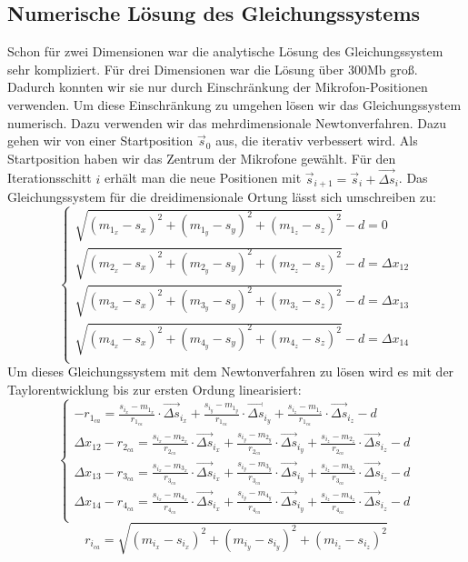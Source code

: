 \subsection{Numerische Lösung des Gleichungssystems}
Schon für zwei Dimensionen war die analytische Lösung des Gleichungssystem sehr kompliziert. Für drei Dimensionen war die Lösung über 300Mb groß. Dadurch konnten wir sie nur durch Einschränkung der Mikrofon-Positionen verwenden. Um diese Einschränkung zu umgehen lösen wir das Gleichungssystem numerisch. Dazu verwenden wir das mehrdimensionale Newtonverfahren. Dazu gehen wir von einer Startposition $\vec{s}_0$ aus, die iterativ verbessert wird. Als Startposition haben wir das Zentrum der Mikrofone gewählt. Für den Iterationsschitt $i$ erhält man die neue Positionen mit $\vec{s}_{i + 1} = \vec{s}_i + \vec{\Delta{s}}_i$. Das Gleichungssystem für die dreidimensionale Ortung lässt sich umschreiben zu:
$$\begin{cases}
\sqrt{(m_{1_x} - s_x)^2 + (m_{1_y} - s_y)^2 + (m_{1_z} - s_z)^2} - d = 0 \\
\sqrt{(m_{2_x} - s_x)^2 + (m_{2_y} - s_y)^2 + (m_{2_z} - s_z)^2} - d = \Delta{x_{12}} \\
\sqrt{(m_{3_x} - s_x)^2 + (m_{3_y} - s_y)^2 + (m_{3_z} - s_z)^2} - d = \Delta{x_{13}} \\
\sqrt{(m_{4_x} - s_x)^2 + (m_{4_y} - s_y)^2 + (m_{4_z} - s_z)^2} - d = \Delta{x_{14}} \\
\end{cases}$$
Um dieses Gleichungssystem mit dem Newtonverfahren zu lösen wird es mit der Taylorentwicklung bis zur ersten Ordung linearisiert:
$$\begin{cases}
-r_{1_{ca}} = \frac{s_{i_x} - m_{1_x}}{r_{1_{ca}}} \cdot \vec{\Delta{s}}_{i_x} + \frac{s_{i_y} - m_{1_y}}{r_{1_{ca}}} \cdot \vec{\Delta{s}}_{i_y} + \frac{s_{i_z} - m_{1_z}}{r_{1_{ca}}} \cdot \vec{\Delta{s}}_{i_z} - d \\
\Delta{x_{12}} - r_{2_{ca}} = \frac{s_{i_x} - m_{2_x}}{r_{2_{ca}}} \cdot \vec{\Delta{s}}_{i_x} + \frac{s_{i_y} - m_{2_y}}{r_{2_{ca}}} \cdot \vec{\Delta{s}}_{i_y} + \frac{s_{i_z} - m_{2_z}}{r_{2_{ca}}} \cdot \vec{\Delta{s}}_{i_z} - d \\
\Delta{x_{13}} - r_{3_{ca}} = \frac{s_{i_x} - m_{3_x}}{r_{3_{ca}}} \cdot \vec{\Delta{s}}_{i_x} + \frac{s_{i_y} - m_{3_y}}{r_{3_{ca}}} \cdot \vec{\Delta{s}}_{i_y} + \frac{s_{i_z} - m_{3_z}}{r_{3_{ca}}} \cdot \vec{\Delta{s}}_{i_z} - d \\
\Delta{x_{14}} - r_{4_{ca}} = \frac{s_{i_x} - m_{4_x}}{r_{4_{ca}}} \cdot \vec{\Delta{s}}_{i_x} + \frac{s_{i_y} - m_{4_y}}{r_{4_{ca}}} \cdot \vec{\Delta{s}}_{i_y} + \frac{s_{i_z} - m_{4_z}}{r_{4_{ca}}} \cdot \vec{\Delta{s}}_{i_z} - d \\
\end{cases}$$
$$r_{i_{ca}} = \sqrt{(m_{i_x} - s_{i_x})^2 + (m_{i_y} - s_{i_y})^2 + (m_{i_z} - s_{i_z})^2}$$

